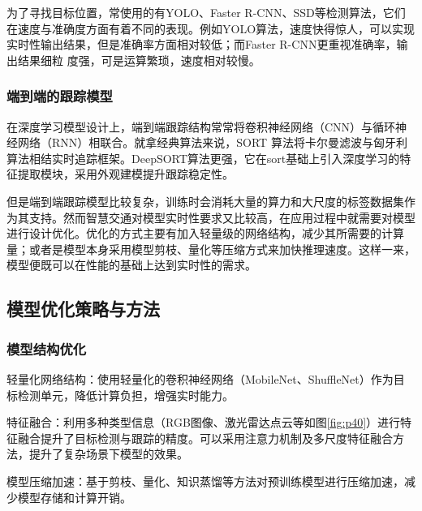 为了寻找目标位置，常使用的有YOLO、Faster R-CNN、SSD等检测算法，它们在速度与准确度方面有着不同的表现。例如YOLO算法，速度快得惊人，可以实现实时性输出结果，但是准确率方面相对较低；而Faster R-CNN更重视准确率，输出结果细粒 度强，可是运算繁琐，速度相对较慢。


\subsubsection{端到端的跟踪模型}


在深度学习模型设计上，端到端跟踪结构常常将卷积神经网络（CNN）与循环神经网络（RNN）相联合。就拿经典算法来说，SORT 算法将卡尔曼滤波与匈牙利算法相结实时追踪框架。DeepSORT算法更强，它在sort基础上引入深度学习的特征提取模块，采用外观建模提升跟踪稳定性。

但是端到端跟踪模型比较复杂，训练时会消耗大量的算力和大尺度的标签数据集作为其支持。然而智慧交通对模型实时性要求又比较高，在应用过程中就需要对模型进行设计优化。优化的方式主要有加入轻量级的网络结构，减少其所需要的计算量；或者是模型本身采用模型剪枝、量化等压缩方式来加快推理速度。这样一来，模型便既可以在性能的基础上达到实时性的需求。


\subsection{模型优化策略与方法}

\subsubsection{模型结构优化}

轻量化网络结构：使用轻量化的卷积神经网络（MobileNet、ShuffleNet）作为目标检测单元，降低计算负担，增强实时能力。

特征融合：利用多种类型信息（RGB图像、激光雷达点云等如图\ref{fig:p40}）进行特征融合提升了目标检测与跟踪的精度。可以采用注意力机制及多尺度特征融合方法，提升了复杂场景下模型的效果。

模型压缩加速：基于剪枝、量化、知识蒸馏等方法对预训练模型进行压缩加速，减少模型存储和计算开销。





